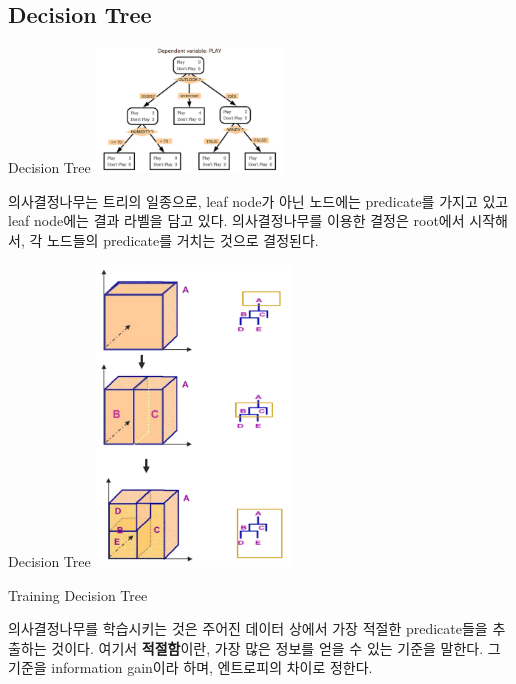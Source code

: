 \documentclass{beamer}
\begin{document}
\subsection{Decision Tree} 

\begin{frame}{Decision Tree}
\includegraphics[width=5cm,keepaspectratio]{decisiontree}

의사결정나무는 트리의 일종으로, leaf node가 아닌 노드에는 predicate를 가지고 있고 leaf node에는 결과 라벨을 담고 있다. 의사결정나무를 이용한 결정은 root에서 시작해서, 각 노드들의 predicate를 거치는 것으로 결정된다. 
\end{frame}



\begin{frame}{Decision Tree} 
\includegraphics[height=8cm,keepaspectratio]{space}
\end{frame}

\begin{frame}{Training Decision Tree}

의사결정나무를 학습시키는 것은 주어진 데이터 상에서 가장 적절한 predicate들을 추출하는 것이다. 여기서 \textbf{적절함}이란, 가장 많은 정보를 얻을 수 있는 기준을 말한다. 그 기준을 information gain이라 하며, 엔트로피의 차이로 정한다. 
\end{frame}
\end{document}
